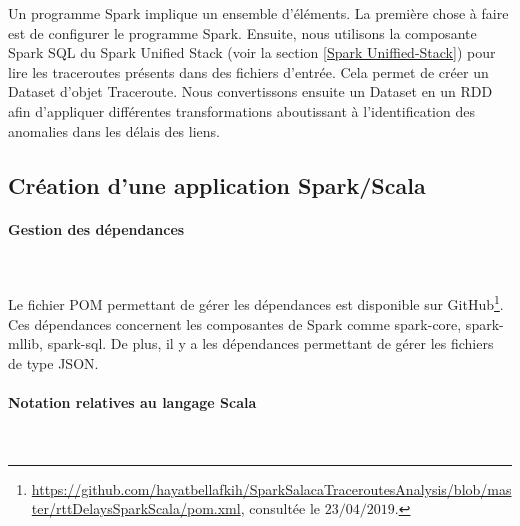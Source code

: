 Un programme Spark implique un ensemble d'éléments. La première chose à faire est de configurer le programme Spark.
Ensuite, nous utilisons la composante Spark SQL   du Spark Unified Stack (voir la section \ref{Spark Uniffied-Stack}) pour lire les traceroutes présents dans des fichiers d'entrée. Cela permet de créer un Dataset d'objet Traceroute.  Nous convertissons ensuite un Dataset en un RDD afin d'appliquer différentes transformations aboutissant à l'identification des anomalies dans les délais des liens.

\subsection{Création d'une application Spark/Scala}

\paragraph{Gestion des dépendances}~

Le fichier POM permettant de gérer les dépendances est disponible sur GitHub\footnote{\url{https://github.com/hayatbellafkih/SparkSalacaTraceroutesAnalysis/blob/master/rttDelaysSparkScala/pom.xml}, consultée le $23/04/2019$.}. Ces dépendances concernent les composantes de Spark comme spark-core, spark-mllib, spark-sql. De plus, il y a les dépendances permettant de gérer les fichiers de type JSON.


\paragraph{Notation relatives au langage Scala}~

